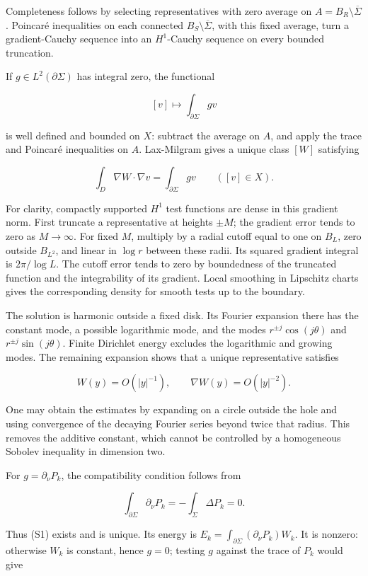 \documentclass[11pt]{article}
\begin{document}
Completeness follows by selecting representatives with zero average on
\(A=B_R\setminus\overline\Sigma\). Poincaré inequalities on each
connected \(B_S\setminus\overline\Sigma\), with this fixed average, turn
a gradient-Cauchy sequence into an \(H^1\)-Cauchy sequence on every
bounded truncation.

If \(g\in L^2(\partial\Sigma)\) has integral zero, the functional

\[
 [v]\longmapsto\int_{\partial\Sigma}gv
\]

is well defined and bounded on \(X\): subtract the average on \(A\), and
apply the trace and Poincaré inequalities on \(A\). Lax-Milgram gives a
unique class \([W]\) satisfying

\[
 \int_D\nabla W\cdot\nabla v
 =\int_{\partial\Sigma}gv\qquad([v]\in X).
 \tag{S7}
\]

For clarity, compactly supported \(H^1\) test functions are dense in
this gradient norm. First truncate a representative at heights
\(\pm M\); the gradient error tends to zero as \(M\to\infty\). For fixed
\(M\), multiply by a radial cutoff equal to one on \(B_L\), zero outside
\(B_{L^2}\), and linear in \(\log r\) between these radii. Its squared
gradient integral is \(2\pi/\log L\). The cutoff error tends to zero by
boundedness of the truncated function and the integrability of its
gradient. Local smoothing in Lipschitz charts gives the corresponding
density for smooth tests up to the boundary.

The solution is harmonic outside a fixed disk. Its Fourier expansion
there has the constant mode, a possible logarithmic mode, and the modes
\(r^{\pm j}\cos(j\theta)\) and \(r^{\pm j}\sin(j\theta)\). Finite
Dirichlet energy excludes the logarithmic and growing modes. The
remaining expansion shows that a unique representative satisfies

\[
 W(y)=O(|y|^{-1}),\qquad \nabla W(y)=O(|y|^{-2}).
 \tag{S8}
\]

One may obtain the estimates by expanding on a circle outside the hole
and using convergence of the decaying Fourier series beyond twice that
radius. This removes the additive constant, which cannot be controlled
by a homogeneous Sobolev inequality in dimension two.

For \(g=\partial_\nu P_k\), the compatibility condition follows from

\[
 \int_{\partial\Sigma}\partial_\nu P_k
 =-\int_\Sigma\Delta P_k=0.
\]

Thus (S1) exists and is unique. Its energy is
\(E_k=\int_{\partial\Sigma}(\partial_\nu P_k)W_k\). It is nonzero:
otherwise \(W_k\) is constant, hence \(g=0\); testing \(g\) against the
trace of \(P_k\) would give
\end{document}
